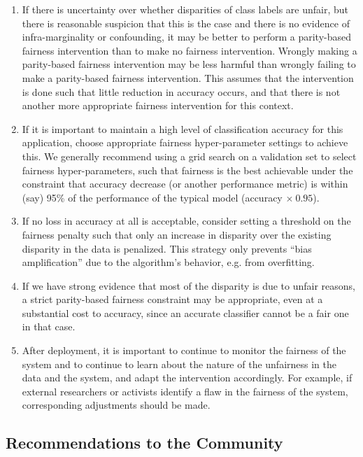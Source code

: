 \documentclass[11pt,dvipdfm]{article}
\begin{document}
\begin{enumerate}
 \item If there is uncertainty over whether disparities of class labels are unfair, but there is reasonable suspicion that this is the case and there is no evidence of infra-marginality or confounding, it may be better to perform a parity-based fairness intervention than to make no fairness intervention.  Wrongly making a parity-based fairness intervention may be less harmful than wrongly failing to make a parity-based fairness intervention.  This assumes that the intervention is done such that little reduction in accuracy occurs, and that there is not another more appropriate fairness intervention for this context. 
 
 \item If it is important to maintain a high level of classification accuracy for this application, choose appropriate fairness hyper-parameter settings to achieve this.  We generally recommend using a grid search on a validation set to select fairness hyper-parameters, such that fairness is the best achievable under the constraint that accuracy decrease (or another performance metric) is within (say) 95\% of the performance of the typical model (accuracy $\times \ 0.95$).
 
 \item If no loss in accuracy at all is acceptable, consider setting a threshold on the fairness penalty such that only an increase in disparity over the existing disparity in the data is penalized.  This strategy only prevents ``bias amplification'' due to the algorithm's behavior, e.g. from overfitting.
 
 \item If we have strong evidence that most of the disparity is due to unfair reasons, a strict parity-based fairness constraint may be appropriate, even at a substantial cost to accuracy, since an accurate classifier cannot be a fair one in that case.
  
 \item After deployment, it is important to continue to monitor the fairness of the system and to continue to learn about the nature of the unfairness in the data and the system, and adapt the intervention accordingly.  For example, if external researchers or activists identify a flaw in the fairness of the system, corresponding adjustments should be made. 


\end{enumerate}
  
\subsection{Recommendations to the Community}
\end{document}
